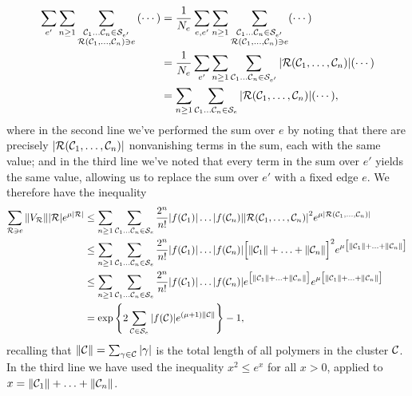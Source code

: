\begin{subequations}
    \begin{align}
        \sum_{e'} \sum_{n \geq 1} \sum_{\substack{\mathcal{C}_1 \ldots \mathcal{C}_n \in \mathcal{S}_{e'} \\ \mathcal{R}(\mathcal{C}_1 , \ldots , \mathcal{C}_n) \ni e}} \qty(\cdots) &= \frac{1}{N_e} \sum_{e,e'} \sum_{n \geq 1} \sum_{\substack{\mathcal{C}_1 \ldots \mathcal{C}_n \in \mathcal{S}_{e'} \\ \mathcal{R}(\mathcal{C}_1 , \ldots , \mathcal{C}_n) \ni e}} (\cdots) \\
        &= \frac{1}{N_e} \sum_{e'} \sum_{n \geq 1} \sum_{\mathcal{C}_1 \ldots \mathcal{C}_n \in \mathcal{S}_{e'}} \abs{\mathcal{R}(\mathcal{C}_1 , \ldots , \mathcal{C}_n)} (\cdots) \\
        &= \sum_{n \geq 1} \sum_{\mathcal{C}_1 \ldots \mathcal{C}_n \in \mathcal{S}_{e}} \abs{\mathcal{R}(\mathcal{C}_1 , \ldots , \mathcal{C}_n)} (\cdots) ,
    \end{align}
\end{subequations}
where in the second line we've performed the sum over $e$ by noting that there are precisely $\abs{\mathcal{R}(\mathcal{C}_1 , \ldots , \mathcal{C}_n)}$ nonvanishing terms in the sum, each with the same value; and in the third line we've noted that every term in the sum over $e'$ yields the same value, allowing us to replace the sum over $e'$ with a fixed edge $e$. We therefore have the inequality
\begin{subequations}
    \begin{align}
        \sum_{\mathcal{R} \ni e} \norm{V_{\mathcal{R}}} |\mathcal{R}| e^{\mu |\mathcal{R}|} &\leq \sum_{n \geq 1} \sum_{\mathcal{C}_1 \ldots \mathcal{C}_n \in \mathcal{S}_e} \frac{2^n}{n!} \abs{f(\mathcal{C}_1)} \ldots \abs{f(\mathcal{C}_n)} \abs{ \mathcal{R}(\mathcal{C}_1 , \ldots , \mathcal{C}_n) }^2 e^{\mu \abs{\mathcal{R}(\mathcal{C}_1 , \ldots , \mathcal{C}_n)}} \\
        &\leq \sum_{n \geq 1} \sum_{\mathcal{C}_1 \ldots \mathcal{C}_n \in \mathcal{S}_e} \frac{2^n}{n!} \abs{f(\mathcal{C}_1)} \ldots \abs{f(\mathcal{C}_n)}  \Big[ \norm{\mathcal{C}_1} + \ldots + \norm{\mathcal{C}_n} \Big]^2 e^{\mu \big[\norm{\mathcal{C}_1} + \ldots + \norm{\mathcal{C}_n} \big] } \\
        &\leq \sum_{n \geq 1} \sum_{\mathcal{C}_1 \ldots \mathcal{C}_n \in \mathcal{S}_e} \frac{2^n}{n!} \abs{f(\mathcal{C}_1)} \ldots \abs{f(\mathcal{C}_n)} e^{\big[ \norm{\mathcal{C}_1} + \ldots + \norm{\mathcal{C}_n} \big]} e^{\mu \big[ \norm{\mathcal{C}_1} + \ldots + \norm{\mathcal{C}_n} \big]} \\
        &= \exp \qty{ 2 \sum_{\mathcal{C}\in \mathcal{S}_e} \abs{f(\mathcal{C})} e^{(\mu + 1) \norm{\mathcal{C}}} } - 1,
    \end{align}
\end{subequations}
recalling that $\norm{\mathcal{C}} = \sum_{\gamma \in \mathcal{C}} \abs{\gamma}$ is the total length of all polymers in the cluster $\mathcal{C}$. In the third line we have used the inequality $x^2 \leq e^{x}$ for all $x > 0$, applied to $x = \norm{\mathcal{C}_1} + \ldots + \norm{\mathcal{C}_n}$.

